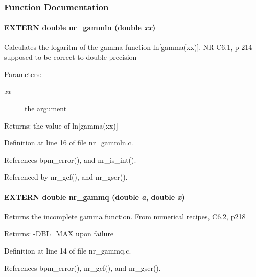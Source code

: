 \subsubsection{Function Documentation}
\paragraph[nr\_\-gammln]{\setlength{\rightskip}{0pt plus 5cm}EXTERN double nr\_\-gammln (double {\em xx})}\hfill\label{group__nr_g6ae24cf46e0892de684b643e71bc9647}


Calculates the logaritm of the gamma function ln[gamma(xx)]. NR C6.1, p 214 supposed to be correct to double precision

\begin{Desc}
\item[Parameters:]
\begin{description}
\item[{\em xx}]the argument \end{description}
\end{Desc}
\begin{Desc}
\item[Returns:]the value of ln[gamma(xx)] \end{Desc}


Definition at line 16 of file nr\_\-gammln.c.

References bpm\_\-error(), and nr\_\-is\_\-int().

Referenced by nr\_\-gcf(), and nr\_\-gser().
\paragraph[nr\_\-gammq]{\setlength{\rightskip}{0pt plus 5cm}EXTERN double nr\_\-gammq (double {\em a}, \/  double {\em x})}\hfill\label{group__nr_g41fc6ed71a183a27120b1741859b11f8}


Returns the incomplete gamma function. From numerical recipes, C6.2, p218

\begin{Desc}
\item[Returns:]-DBL\_\-MAX upon failure \end{Desc}


Definition at line 14 of file nr\_\-gammq.c.

References bpm\_\-error(), nr\_\-gcf(), and nr\_\-gser().

